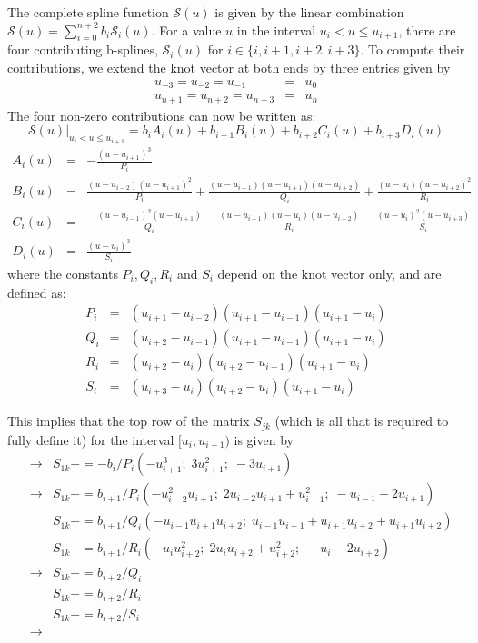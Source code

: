 \documentclass[a4paper,10pt,twosided]{article}
\begin{document}
The complete spline function $ \mathcal{S}(u)$ is given by the linear combination $\mathcal{S}(u)= \sum_{i=0}^{n+2} b_i  \mathcal{S}_i(u)$.
For a value $u$ in the interval $u_{i}<  u\le u_{i+1}$, there are four contributing b-splines, $\mathcal{S}_i(u)$ for $i\in \{i,i+1,i+2,i+3\}$.
To compute their contributions, we extend the knot vector at both ends by three entries given by  
\begin{eqnarray*}
   u_{-3}=u_{-2}=u_{-1}&=&u_0
\\ u_{n+1}=u_{n+2}=u_{n+3}&=&u_n
\end{eqnarray*}
The four non-zero contributions can now be written as:
\begin{equation}
   \left. \mathcal{S}(u)\right|_{u_i<u\le u_{i+1}} = b_i A_i(u) + b_{i+1} B_i(u) + b_{i+2} C_i(u) + b_{i+3} D_i(u)
\end{equation}
\begin{eqnarray*}
     A_i(u) &=& -\frac{(u-u_{i+1})^3}{P_i}  
\\   B_i(u) &=&  \frac{(u-u_{i-2})(u-u_{i+1})^2 }{P_i} + \frac{ (u-u_{i-1})(u-u_{i+1})(u-u_{i+2}) }{Q_i} + \frac{ (u-u_i)(u-u_{i+2})^2 }{R_i}
\\   C_i(u) &=& -\frac{(u-u_{i-1})^2(u-u_{i+1}) }{Q_i} - \frac{ (u-u_{i-1})(u-u_i )(u-u_{i+2}) }{R_i} - \frac{ (u-u_i)^2(u-u_{i+3}) }{S_i}
\\   D_i(u) &=&  \frac{(u-u_i)^3 }{S_i}
\end{eqnarray*}
where the constants $P_i,Q_i,R_i$ and $S_i$ depend on the knot vector only, and are defined as:
\begin{eqnarray*}
    P_i &=&(u_{i+1}-u_{i-2})(u_{i+1}-u_{i-1})(u_{i+1}-u_i)
\\  Q_i &=&(u_{i+2}-u_{i-1})(u_{i+1}-u_{i-1})(u_{i+1}-u_i)
\\  R_i &=&(u_{i+2}-u_{i  })(u_{i+2}-u_{i-1})(u_{i+1}-u_i)
\\  S_i &=&(u_{i+3}-u_{i  })(u_{i+2}-u_{i  })(u_{i+1}-u_i)
\end{eqnarray*}

This implies that the top row of the matrix $S_{jk}$ (which is all that is required to fully define it) for the
interval $[u_i,u_{i+1})$ is given by
\begin{eqnarray*}
            &\rightarrow& S_{1k} += -b_i/P_i  ( -u_{i+1}^3;\; 3u_{i+1}^2 ;\;-3u_{i+1} )
     \\     &\rightarrow& S_{1k} += b_{i+1}/P_i (-u_{i-2}^2u_{i+1};\; 2u_{i-2}u_{i+1}+u_{i+1}^2;\;  -u_{i-1}-2u_{i+1} )
     \\     &           & S_{1k} += b_{i+1}/Q_i (-u_{i-1}u_{i+1}u_{i+2};\; u_{i-1}u_{i+1}+u_{i+1}u_{i+2}+u_{i+1}u_{i+2} )
     \\     &           & S_{1k} += b_{i+1}/R_i (-u_i u_{i+2}^2;\; 2u_iu_{i+2}+u_{i+2}^2;\;-u_i-2u_{i+2} )
     \\     &\rightarrow& S_{1k} += b_{i+2}/Q_i
     \\     &           & S_{1k} += b_{i+2}/R_i
     \\     &           & S_{1k} += b_{i+2}/S_i
     \\     &\rightarrow& 
\end{eqnarray*}
\end{document}
